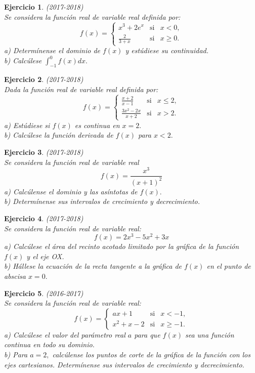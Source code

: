 \documentclass[12pt, a4paper]{amsart}
\newtheorem{ejer}{Ejercicio}
\begin{document}
\begin{ejer}\em (2017-2018)\\
Se considera la función real de variable real definida por:
\[
f(x)=\left \{ \begin{matrix}
x^3+2e^x & \text{si} & x< 0,\\
\frac{2}{3+x} & \text{si} & x\geq 0.
\end{matrix}\right.
\]
a) Determínense el dominio de $f (x)$ y estúdiese su continuidad.\\
b) Calcúlese $\int_{-1}^0f(x)dx.$
\end{ejer}

\begin{ejer}\em (2017-2018)\\
Dada la función real de variable real definida por:\[
f(x)=\left \{ \begin{matrix}
\frac{x+2}{x-1} & \text{si} & x\leq 2,\\
\frac{3x^2-2x}{x+2} & \text{si} & x>2.
\end{matrix}\right.
\]
a) Estúdiese si $f (x)$ es continua en $x = 2.$\\
b) Calcúlese la función derivada de $f (x)$ para $x < 2.$
\end{ejer}

\begin{ejer}\em (2017-2018)\\
Se considera la función real de variable real
\[f(x)=\frac{x^3}{(x+1)^2}\]
a) Calcúlense el dominio y las asíntotas de $f (x).$\\
b) Determínense sus intervalos de crecimiento y decrecimiento.
\end{ejer}

\begin{ejer}\em (2017-2018)\\
Se considera la función real de variable real:
\[f(x)=2x^3-5x^2+3x\]
a) Calcúlese el área del recinto acotado limitado por la gráfica de la función $f (x)$ y el eje OX.\\
b) Hállese la ecuación de la recta tangente a la gráfica de $f (x)$ en el punto de abscisa $x = 0.$
\end{ejer}

\begin{ejer}\em (2016-2017)\\
Se considera la función real de variable real:
\[
f(x)=\left \{ \begin{matrix}
ax+1 & \text{si} & x<-1,\\
x^2+x-2 & \text{si} & x\geq -1.
\end{matrix}\right.
\]
a) Calcúlese el valor del parámetro real $a$ para que $f (x)$ sea una función continua en todo su dominio.\\
b) Para $a = 2,$ calcúlense los puntos de corte de la gráfica de la función con los ejes cartesianos. Determínense sus intervalos de crecimiento y decrecimiento.
\end{ejer}
\end{document}
